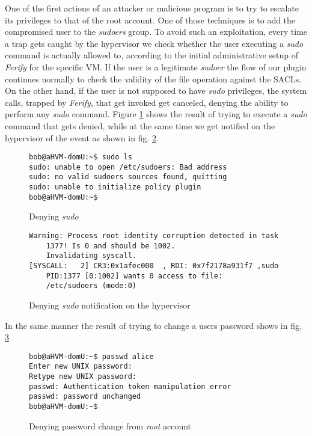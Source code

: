 \par One of the first actions of an attacker or malicious program is to try to escalate its privileges to that of the root account. One of those techniques is to add the compromised user to the \emph{sudoers} group. To avoid such an exploitation, every time a trap gets caught by the hypervisor we check whether the user executing a \emph{sudo} command is actually allowed to, according to the initial administrative setup of \emph{Ferify} for the specific \ac{VM}. If the user is a legitimate \emph{sudoer} the flow of our plugin continues normally to check the validity of the file operation against the \acp{SACL}. On the other hand, if the user is not supposed to have \emph{sudo} privileges, the system calls, trapped by \emph{Ferify}, that get invoked get canceled, denying the ability to perform any \emph{sudo} command. Figure \ref{fig:sudo_deny} shows the result of trying to execute a \emph{sudo} command that gets denied, while at the same time we get notified on the hypervisor of the event as shown in fig. \ref{fig:sudo_deny_not}.

\begin{figure}[ht]
	\centering
	\footnotesize{\selectfont 
		\begin{lstlisting}
bob@aHVM-domU:~$ sudo ls
sudo: unable to open /etc/sudoers: Bad address
sudo: no valid sudoers sources found, quitting
sudo: unable to initialize policy plugin
bob@aHVM-domU:~$
		\end{lstlisting}}
	\caption{Denying \emph{sudo}}
	\label{fig:sudo_deny}
\end{figure}

\begin{figure}[ht]
	\centering
	\footnotesize{\selectfont 
		\begin{lstlisting}
Warning: Process root identity corruption detected in task 
	1377! Is 0 and should be 1002. 
	Invalidating syscall.
[SYSCALL:   2] CR3:0x1afec000  , RDI: 0x7f2178a931f7 ,sudo 
	PID:1377 [0:1002] wants 0 access to file: 
	/etc/sudoers (mode:0)
		\end{lstlisting}}
	\caption{Denying \emph{sudo} notification on the hypervisor}
	\label{fig:sudo_deny_not}
\end{figure}

\par In the same manner the result of trying to change a users password shows in fig. \ref{fig:passwd_deny}

\begin{figure}[ht]
	\centering
	\footnotesize{\selectfont 
		\begin{lstlisting}
bob@aHVM-domU:~$ passwd alice
Enter new UNIX password:
Retype new UNIX password:
passwd: Authentication token manipulation error
passwd: password unchanged
bob@aHVM-domU:~$
		\end{lstlisting}}
	\caption{Denying password change from \emph{root} account}
	\label{fig:passwd_deny}
\end{figure}


